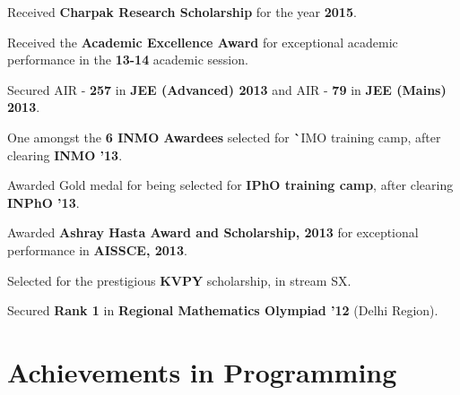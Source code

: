 \documentclass[a4paper]{norm-resume}
\begin{document}
\begin{tightitemize}
	\item Received \textbf{Charpak Research Scholarship} for the year \textbf{2015}.
	\item Received the \textbf{Academic Excellence Award} for exceptional academic performance in the \textbf{13-14} academic session.
	\item Secured AIR - \textbf{257} in {\textbf{JEE (Advanced) 2013}} and AIR - {\textbf{79}} in \textbf{JEE (Mains) 2013}.
	\item One amongst the \textbf{6 INMO Awardees} selected for \textbf`{IMO training camp}, after clearing \textbf{INMO '13}.
	\item Awarded Gold medal for being selected for \textbf{IPhO training camp}, after clearing \textbf{INPhO '13}.
	\item Awarded \textbf{Ashray Hasta Award and Scholarship, 2013} for exceptional performance in \textbf{AISSCE, 2013}.
	\item Selected for the prestigious \textbf{KVPY} scholarship, in stream SX.
	\item Secured \textbf{Rank 1} in \textbf{Regional Mathematics Olympiad '12} (Delhi Region).	
\end{tightitemize}
	
\vspace{1mm}	%


\section{Achievements in Programming}

\vspace{3mm} %
\end{document}
